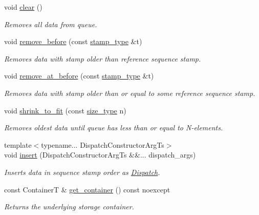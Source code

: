 \begin{DoxyCompactItemize}
\mbox{\label{classflow_1_1_dispatch_queue_a184d59ca79ec916af7c2866eb1d3fa6e}} 
void \hyperlink{classflow_1_1_dispatch_queue_a184d59ca79ec916af7c2866eb1d3fa6e}{clear} ()
\begin{DoxyCompactList}\small\item\em Removes all data from queue. \end{DoxyCompactList}\item 
void \hyperlink{classflow_1_1_dispatch_queue_acde2f5e2318031aa5b316f8e82d799fc}{remove\+\_\+before} (const \hyperlink{classflow_1_1_dispatch_queue_a7908f3d78b7f1767462244b94434d748}{stamp\+\_\+type} \&t)
\begin{DoxyCompactList}\small\item\em Removes data with stamp older than reference sequence stamp. \end{DoxyCompactList}\item 
void \hyperlink{classflow_1_1_dispatch_queue_a43f52337c1d8347da274a2fa93dc503c}{remove\+\_\+at\+\_\+before} (const \hyperlink{classflow_1_1_dispatch_queue_a7908f3d78b7f1767462244b94434d748}{stamp\+\_\+type} \&t)
\begin{DoxyCompactList}\small\item\em Removes data with stamp older than or equal to some reference sequence stamp. \end{DoxyCompactList}\item 
void \hyperlink{classflow_1_1_dispatch_queue_a66f89e3d5c95709662227ce275f00607}{shrink\+\_\+to\+\_\+fit} (const \hyperlink{classflow_1_1_dispatch_queue_afdc67058e3461410fdd6170046df55bc}{size\+\_\+type} n)
\begin{DoxyCompactList}\small\item\em Removes oldest data until queue has less than or equal to N-\/elements. \end{DoxyCompactList}\item 
{\footnotesize template$<$typename... Dispatch\+Constructor\+Arg\+Ts$>$ }\\void \hyperlink{classflow_1_1_dispatch_queue_a5221c73d3790e6795c48229a2bcd7c0e}{insert} (Dispatch\+Constructor\+Arg\+Ts \&\&... dispatch\+\_\+args)
\begin{DoxyCompactList}\small\item\em Inserts data in sequence stamp order as \hyperlink{classflow_1_1_dispatch}{Dispatch}. \end{DoxyCompactList}\item 
\mbox{\label{classflow_1_1_dispatch_queue_a392c5f0f8ba079784188dd946684fade}} 
const ContainerT \& \hyperlink{classflow_1_1_dispatch_queue_a392c5f0f8ba079784188dd946684fade}{get\+\_\+container} () const noexcept
\begin{DoxyCompactList}\small\item\em Returns the underlying storage container. \end{DoxyCompactList}\end{DoxyCompactItemize}



